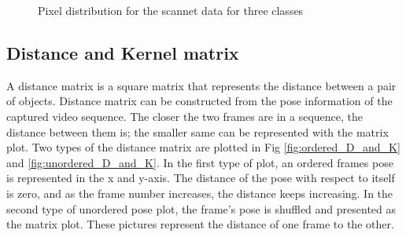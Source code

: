    	\begin{figure}%
    	\centering
    	\qquad
    	\caption{Pixel distribution for the scannet data for three classes}%
    	\label{fig:scannet_three_classes}%
    \end{figure}
    \subsection{Distance and Kernel matrix}
	
	A distance matrix is a square matrix that represents the distance between a pair of objects. Distance matrix can be constructed from the pose information of the captured video sequence. The closer the two frames are in a sequence, the distance between them is; the smaller same can be represented with the matrix plot. Two types of the distance matrix are plotted in Fig \ref{fig:ordered_D_and_K} and \ref{fig:unordered_D_and_K}. In the first type of plot, an ordered frames pose is represented in the x and y-axis. The distance of the pose with respect to itself is zero, and as the frame number increases, the distance keeps increasing. In the second type of unordered pose plot, the frame's pose is shuffled and presented as the matrix plot. These pictures represent the distance of one frame to the other. 
	
